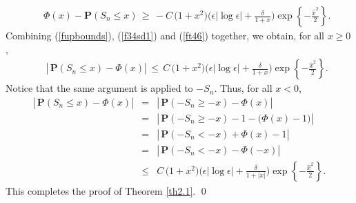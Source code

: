 \documentclass{gSTA2e}
\theoremstyle{plain}
\theoremstyle{definition}
\theoremstyle{remark}
\begin{document}
\begin{eqnarray}\label{ft46}
&& \Phi\left( x \right) -  \mathbf{P}(S_n\leq x )   \, \geq \,  - C \,    \Big(1+x^2 \Big)\Big(  \epsilon |\log \epsilon |  + \frac{\delta}{1+x } \Big)\exp\left\{ -\frac{\widehat{ x }^2 }{2} \right\}.
\end{eqnarray}
Combining  (\ref{fupbounds}), (\ref{f34sd1}) and (\ref{ft46}) together, we obtain, for all $ x \geq 0$,
\begin{eqnarray*}
&& \left|\frac{}{}   \mathbf{P}(S_n\leq x ) - \Phi\left( x \right)\right|  \,  \leq\, C \,\Big(1+x^2 \Big)\Big( \epsilon |\log \epsilon |  + \frac{\delta}{1+x } \Big)\exp\left\{ -\frac{\widehat{ x }^2 }{2} \right\}.
\end{eqnarray*}
Notice that the same argument is applied to $-S_n$. Thus, for all $x<0$,
\begin{eqnarray}
\left|\frac{}{}   \mathbf{P}(S_n\leq x ) - \Phi\left( x \right)\right| &=& \left|\frac{}{}   \mathbf{P}( -S_n\geq -x ) - \Phi\left( x \right)\right| \nonumber\\
&=& \left|\frac{}{}   \mathbf{P}( -S_n\geq -x )-1 - \Big(\Phi\left( x \right)-1 \Big)\right| \nonumber\\
&=& \left|\frac{}{}   \mathbf{P}( -S_n <  -x )+\Phi\left( x \right)-1  \right| \nonumber\\
&=& \left|\frac{}{}   \mathbf{P}( -S_n < -x )  -  \Phi\left( -x \right) \right| \nonumber\\
&\leq&C \, \Big(1+x^2 \Big) \Big( \epsilon |\log \epsilon |  + \frac{\delta}{1+ |x| }  \Big)\exp\left\{ -\frac{\widehat{  x  }^2 }{2} \right\}.
\end{eqnarray}
This completes the proof of Theorem  \ref{th2.1}. \hfill\qed
\end{document}
